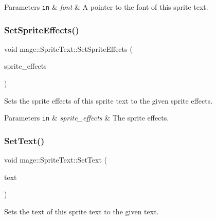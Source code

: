 \begin{DoxyParams}[1]{Parameters}
\mbox{\tt in}  & {\em font} & A pointer to the font of this sprite text. \\
\hline
\end{DoxyParams}
\hypertarget{classmage_1_1_sprite_text_ab457137566eb5a57562c7ff6d387fc93}{}\label{classmage_1_1_sprite_text_ab457137566eb5a57562c7ff6d387fc93} 
\subsubsection{\texorpdfstring{Set\+Sprite\+Effects()}{SetSpriteEffects()}}
{\footnotesize\ttfamily void mage\+::\+Sprite\+Text\+::\+Set\+Sprite\+Effects (\begin{DoxyParamCaption}\item[{\hyperlink{namespacemage_a9cfe18123066ba4236f548f9de75d881}{Sprite\+Effect}}]{sprite\+\_\+effects }\end{DoxyParamCaption})\hspace{0.3cm}{\ttfamily [noexcept]}}

Sets the sprite effects of this sprite text to the given sprite effects.


\begin{DoxyParams}[1]{Parameters}
\mbox{\tt in}  & {\em sprite\+\_\+effects} & The sprite effects. \\
\hline
\end{DoxyParams}
\hypertarget{classmage_1_1_sprite_text_a6853a914502bb28cfc4dc14160345542}{}\label{classmage_1_1_sprite_text_a6853a914502bb28cfc4dc14160345542} 
\subsubsection{\texorpdfstring{Set\+Text()}{SetText()}}
{\footnotesize\ttfamily void mage\+::\+Sprite\+Text\+::\+Set\+Text (\begin{DoxyParamCaption}\item[{\hyperlink{classmage_1_1_color_string}{Color\+String}}]{text }\end{DoxyParamCaption})}

Sets the text of this sprite text to the given text.


